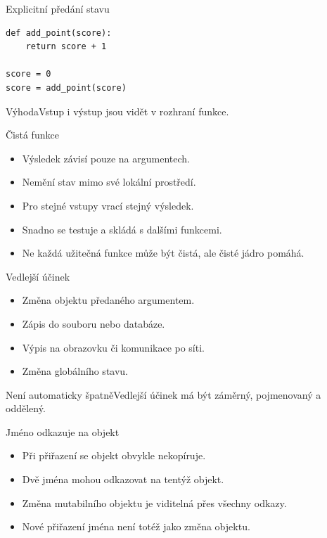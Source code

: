 \documentclass[aspectratio=169]{beamer}
\begin{document}
\begin{frame}[fragile]{Explicitní předání stavu}
\begin{lstlisting}[style=python]
def add_point(score):
    return score + 1

score = 0
score = add_point(score)
\end{lstlisting}
\begin{block}{Výhoda}Vstup i výstup jsou vidět v rozhraní funkce.\end{block}
\end{frame}

\begin{frame}{Čistá funkce}
\begin{itemize}
\item Výsledek závisí pouze na argumentech.
\item Nemění stav mimo své lokální prostředí.
\item Pro stejné vstupy vrací stejný výsledek.
\item Snadno se testuje a skládá s dalšími funkcemi.
\item Ne každá užitečná funkce může být čistá, ale čisté jádro pomáhá.
\end{itemize}
\end{frame}

\begin{frame}{Vedlejší účinek}
\begin{itemize}
\item Změna objektu předaného argumentem.
\item Zápis do souboru nebo databáze.
\item Výpis na obrazovku či komunikace po síti.
\item Změna globálního stavu.
\end{itemize}
\begin{block}{Není automaticky špatně}Vedlejší účinek má být záměrný, pojmenovaný a oddělený.\end{block}
\end{frame}

\begin{frame}{Jméno odkazuje na objekt}
\begin{itemize}
\item Při přiřazení se objekt obvykle nekopíruje.
\item Dvě jména mohou odkazovat na tentýž objekt.
\item Změna mutabilního objektu je viditelná přes všechny odkazy.
\item Nové přiřazení jména není totéž jako změna objektu.
\end{itemize}
\end{frame}
\end{document}
